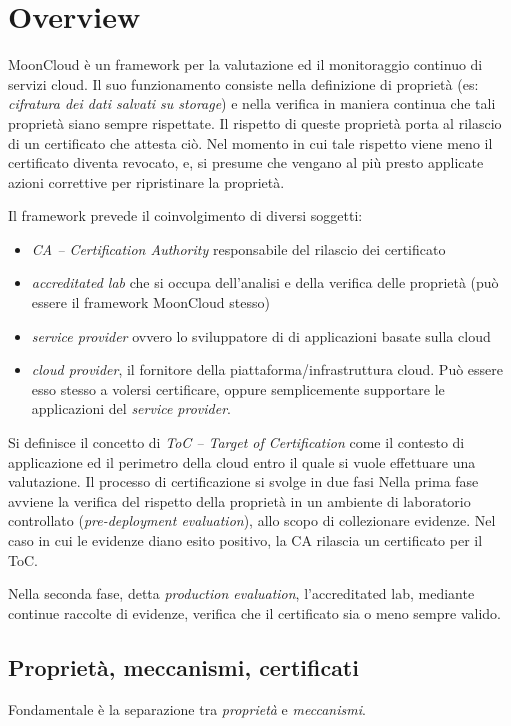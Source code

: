 \section{Overview}\label{sec:mooncloud-overview}
MoonCloud è un framework per la valutazione ed il monitoraggio continuo
di servizi cloud.
Il suo funzionamento consiste nella definizione di proprietà (es: \textit{cifratura
dei dati salvati su storage}) e nella verifica in maniera continua che tali
proprietà siano sempre rispettate. Il rispetto di queste proprietà porta al
rilascio di un certificato che attesta ciò. Nel momento in cui
tale rispetto viene meno il certificato diventa revocato, e, si presume
che vengano al più presto applicate azioni correttive per ripristinare
la proprietà.


Il framework prevede il coinvolgimento di diversi soggetti:
\begin{itemize}
	\item \textit{CA -- Certification Authority} responsabile del
	      rilascio dei certificato
	\item \textit{accreditated lab} che si occupa dell'analisi e della
	      verifica delle proprietà (può essere il framework MoonCloud stesso)
	\item \textit{service provider} ovvero lo sviluppatore di di applicazioni
	      basate sulla cloud
	\item \textit{cloud provider}, il fornitore della piattaforma/infrastruttura
	      cloud. Può essere esso stesso a volersi certificare, oppure semplicemente
	      supportare le applicazioni del \textit{service provider}.
\end{itemize}

Si definisce il concetto di \textit{ToC -- Target of Certification} come il
contesto di applicazione ed il perimetro della cloud entro il quale
si vuole effettuare una valutazione.
Il processo di certificazione si svolge in due fasi Nella prima fase
avviene la verifica del rispetto della proprietà in un ambiente di
laboratorio controllato (\textit{pre-deployment evaluation}), allo scopo
di collezionare evidenze.
Nel caso in cui le evidenze diano esito positivo, la CA rilascia
un certificato per il ToC.

Nella seconda fase, detta \textit{production evaluation}, l'accreditated
lab, mediante continue raccolte di evidenze, verifica che il certificato sia o meno
sempre valido.

\subsection{Proprietà, meccanismi, certificati}
Fondamentale è la separazione tra \textit{proprietà} e \textit{meccanismi}.

